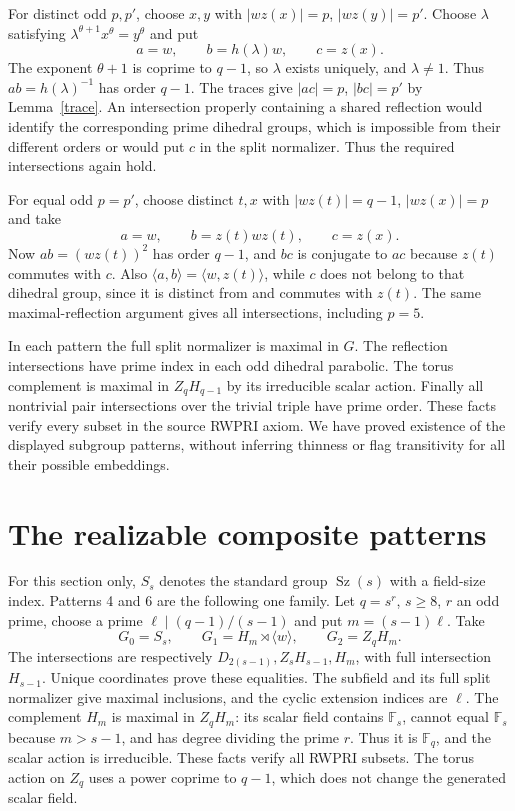 \documentclass[11pt,a4paper]{article}
\newcommand{\Sz}{\operatorname{Sz}}\newcommand{\F}{\mathbb F}
\newcommand{\gen}[1]{\langle#1\rangle}
\begin{document}
For distinct odd $p,p'$, choose $x,y$ with $|wz(x)|=p$,
$|wz(y)|=p'$. Choose $\lambda$ satisfying
$\lambda^{\theta+1}x^\theta=y^\theta$ and put
\[
 a=w,\qquad b=h(\lambda)w,\qquad c=z(x).
\]
The exponent $\theta+1$ is coprime to $q-1$, so $\lambda$ exists
uniquely, and $\lambda\ne1$. Thus $ab=h(\lambda)^{-1}$ has order
$q-1$. The traces give $|ac|=p$, $|bc|=p'$ by Lemma~\ref{trace}.
An intersection properly containing a shared reflection would identify
the corresponding prime dihedral groups, which is impossible from their
different orders or would put $c$ in the split normalizer. Thus the
required intersections again hold.

For equal odd $p=p'$, choose distinct $t,x$ with $|wz(t)|=q-1$,
$|wz(x)|=p$ and take
\[
 a=w,\qquad b=z(t)wz(t),\qquad c=z(x).
\]
Now $ab=(wz(t))^2$ has order $q-1$, and $bc$ is conjugate to $ac$
because $z(t)$ commutes with $c$. Also
$\gen{a,b}=\gen{w,z(t)}$, while $c$ does not belong to that dihedral
group, since it is distinct from and commutes with $z(t)$. The same
maximal-reflection argument gives all intersections, including $p=5$.

In each pattern the full split normalizer is maximal in $G$.
The reflection intersections have prime index in each odd dihedral
parabolic. The torus complement is maximal in $Z_qH_{q-1}$ by its
irreducible scalar action. Finally all nontrivial pair intersections
over the trivial triple have prime order. These facts verify every
subset in the source RWPRI axiom. We have proved existence of the
displayed subgroup patterns, without inferring thinness or flag transitivity
for all their possible embeddings.

\section{The realizable composite patterns}
For this section only, $S_s$ denotes the standard group $\Sz(s)$
with a field-size index. Patterns 4 and 6 are the following one family.
Let $q=s^r$, $s\ge8$, $r$ an odd prime, choose a prime
$\ell\mid(q-1)/(s-1)$ and put $m=(s-1)\ell$. Take
\[
 G_0=S_s,\qquad G_1=H_m\rtimes\gen w,\qquad G_2=Z_qH_m.
\]
The intersections are respectively
$D_{2(s-1)},Z_sH_{s-1},H_m$, with full intersection $H_{s-1}$.
Unique coordinates prove these equalities. The subfield and its full
split normalizer give maximal inclusions, and the cyclic extension
indices are $\ell$. The complement $H_m$ is maximal in $Z_qH_m$:
its scalar field contains $\F_s$, cannot equal $\F_s$ because
$m>s-1$, and has degree dividing the prime $r$. Thus it is $\F_q$,
and the scalar action is irreducible. These facts verify all RWPRI
subsets. The torus action on $Z_q$ uses a power coprime to $q-1$,
which does not change the generated scalar field.
\end{document}
